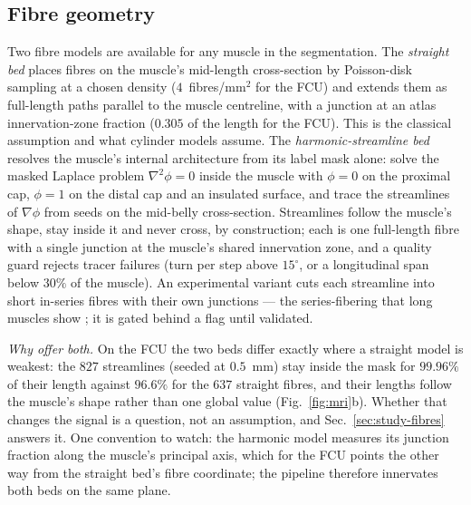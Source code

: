 \documentclass[11pt,a4paper]{article}
\begin{document}
\subsection{Fibre geometry}
\label{sec:fibres}
Two fibre models are available for any muscle in the segmentation. The \emph{straight
bed} places fibres on the muscle's mid-length cross-section by Poisson-disk sampling at a
chosen density ($4$~fibres/mm$^2$ for the FCU) and extends them as full-length paths
parallel to the muscle centreline, with a junction at an atlas innervation-zone fraction
($0.305$ of the length for the FCU). This is the classical assumption and what cylinder
models assume. The \emph{harmonic-streamline bed} resolves the muscle's internal
architecture from its label mask alone: solve the masked Laplace problem
$\nabla^2\phi = 0$ inside the muscle with $\phi=0$ on the proximal cap, $\phi=1$ on the
distal cap and an insulated surface, and trace the streamlines of $\nabla\phi$ from seeds
on the mid-belly cross-section. Streamlines follow the muscle's shape, stay inside it and
never cross, by construction; each is one full-length fibre with a single junction at the
muscle's shared innervation zone, and a quality guard rejects tracer failures (turn per
step above $15^\circ$, or a longitudinal span below $30\%$ of the muscle). An experimental
variant cuts each streamline into short in-series fibres with their own junctions --- the
series-fibering that long muscles show \citep{roeleveld1997motor}; it is gated behind a
flag until validated.

\emph{Why offer both.} On the FCU the two beds differ exactly where a straight model is
weakest: the $827$ streamlines (seeded at $0.5$~mm) stay inside the mask for $99.96\%$ of
their length against $96.6\%$ for the $637$ straight fibres, and their lengths follow
the muscle's shape rather than one global value (Fig.~\ref{fig:mri}b). Whether that
changes the signal is a question, not an assumption, and Sec.~\ref{sec:study-fibres}
answers it. One convention to watch: the harmonic model measures its junction fraction
along the muscle's principal axis, which for the FCU points the other way from the
straight bed's fibre coordinate; the pipeline therefore innervates both beds on the same
plane.
\end{document}
